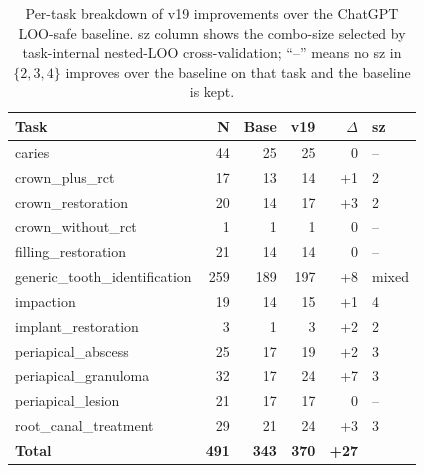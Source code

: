 \begin{table}[t]
\centering
\caption{Per-task breakdown of v19 improvements over the ChatGPT LOO-safe baseline. sz column shows the combo-size selected by task-internal nested-LOO cross-validation; ``--'' means no sz in $\{2,3,4\}$ improves over the baseline on that task and the baseline is kept.}
\label{tab:mmoral-per-task}
\begin{tabular}{lrrrrl}
\toprule
Task & N & Base & v19 & $\Delta$ & sz \\
\midrule
caries                         & 44  & 25 & 25 & 0   & -- \\
crown\_plus\_rct               & 17  & 13 & 14 & +1  & 2 \\
crown\_restoration             & 20  & 14 & 17 & +3  & 2 \\
crown\_without\_rct            & 1   & 1  & 1  & 0   & -- \\
filling\_restoration           & 21  & 14 & 14 & 0   & -- \\
generic\_tooth\_identification & 259 & 189 & 197 & +8 & mixed \\
impaction                      & 19  & 14 & 15 & +1  & 4 \\
implant\_restoration           & 3   & 1  & 3  & +2  & 2 \\
periapical\_abscess            & 25  & 17 & 19 & +2  & 3 \\
periapical\_granuloma          & 32  & 17 & 24 & +7  & 3 \\
periapical\_lesion             & 21  & 17 & 17 & 0   & -- \\
root\_canal\_treatment         & 29  & 21 & 24 & +3  & 3 \\
\midrule
\textbf{Total}                 & \textbf{491} & \textbf{343} & \textbf{370} & \textbf{+27} & \\
\bottomrule
\end{tabular}
\end{table}
